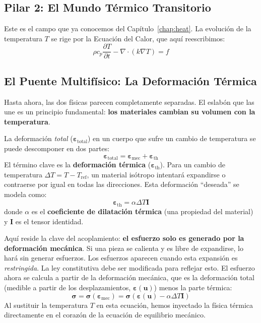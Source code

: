 \subsection{Pilar 2: El Mundo Térmico Transitorio}
Este es el campo que ya conocemos del Capítulo~\ref{chap:heat}. La evolución de la temperatura \(T\) se rige por la Ecuación del Calor, que aquí reescribimos:
\begin{equation}
    \rho c_p \frac{\partial T}{\partial t} - \nabla \cdot (k \nabla T) = f
    \label{eq:thermo-heat-strong}
\end{equation}

\subsection{El Puente Multifísico: La Deformación Térmica}
Hasta ahora, las dos físicas parecen completamente separadas. El eslabón que las une es un principio fundamental: \textbf{los materiales cambian su volumen con la temperatura}.

La deformación \textit{total} (\(\bm{\varepsilon}_{\text{total}}\)) en un cuerpo que sufre un cambio de temperatura se puede descomponer en dos partes:
\[
\bm{\varepsilon}_{\text{total}} = \bm{\varepsilon}_{\text{mec}} + \bm{\varepsilon}_{\text{th}}
\]
El término clave es la \textbf{deformación térmica} (\(\bm{\varepsilon}_{\text{th}}\)). Para un cambio de temperatura \(\Delta T = T - T_{\text{ref}}\), un material isótropo intentará expandirse o contraerse por igual en todas las direcciones. Esta deformación ``deseada'' se modela como:
\begin{equation}
    \bm{\varepsilon}_{\text{th}} = \alpha \Delta T \mathbf{I}
    \label{eq:thermal-strain}
\end{equation}
donde \(\alpha\) es el \textbf{coeficiente de dilatación térmica} (una propiedad del material) y \(\mathbf{I}\) es el tensor identidad.

Aquí reside la clave del acoplamiento: \textbf{el esfuerzo solo es generado por la deformación mecánica}. Si una pieza se calienta y es libre de expandirse, lo hará sin generar esfuerzos. Los esfuerzos aparecen cuando esta expansión es \textit{restringida}. La ley constitutiva debe ser modificada para reflejar esto. El esfuerzo ahora se calcula a partir de la deformación mecánica, que es la deformación total (medible a partir de los desplazamientos, \(\bm{\varepsilon}(\bm{u})\)) menos la parte térmica:
\begin{equation}
    \bm{\sigma} = \bm{\sigma}(\bm{\varepsilon}_{\text{mec}}) = \bm{\sigma}(\bm{\varepsilon}(\bm{u}) - \alpha \Delta T \mathbf{I})
    \label{eq:coupled-stress}
\end{equation}
Al sustituir la temperatura \(T\) en esta ecuación, hemos inyectado la física térmica directamente en el corazón de la ecuación de equilibrio mecánico.

